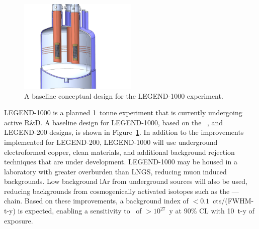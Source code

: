 \documentclass[/main.tex]{subfiles}
\begin{document}
\begin{figure}
  \centering
  \includegraphics[width=0.5\textwidth]{legend1000}
  \caption[Legend-1000 experimental design]{\label{legend1000}
    A baseline conceptual design for the LEGEND-1000 experiment.
  }
\end{figure}
LEGEND-1000 is a planned 1~tonne experiment that is currently undergoing active R\&D.
A baseline design for LEGEND-1000, based on the \Gerda\, \MJD, and LEGEND-200 designs, is shown in Figure~\ref{legend1000}.
In addition to the improvements implemented for LEGEND-200, LEGEND-1000 will use underground electroformed copper, clean materials, and additional background rejection techniques that are under development.
LEGEND-1000 may be housed in a laboratory with greater overburden than LNGS, reducing muon induced backgrounds.
Low background lAr from underground sources will also be used, reducing backgrounds from cosmogenically activated isotopes such as the ---- chain.
Based on these improvements, a background index of $<0.1$~cts/(FWHM-t-y) is expected, enabling a sensitivity to  \znbb\ of $>10^{27}$~y at 90\% CL with 10~t-y of exposure.

\onlyinsubfile{
  
  
}
\end{document}

